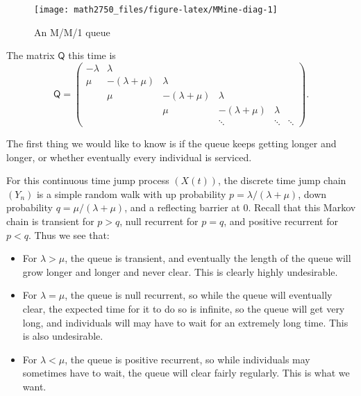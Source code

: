 \documentclass[
  a4paper,
]{article}
\providecommand{\tightlist}{%
  \setlength{\itemsep}{0pt}\setlength{\parskip}{0pt}}
\theoremstyle{definition}
\theoremstyle{definition}
\theoremstyle{definition}
\theoremstyle{remark}
\begin{document}
\begin{figure}

{\centering \texttt{[image: math2750\_files/figure-latex/MMine-diag-1]} 

}

\caption{An M/M/1 queue}\label{fig:MMine-diag}
\end{figure}

The matrix \(\mathsf Q\) this time is
\[ \mathsf Q = \begin{pmatrix}
-\lambda & \lambda          &                  &                  &         &        \\
\mu      & -(\lambda + \mu) & \lambda          &                  &         &        \\
         & \mu              & -(\lambda + \mu) & \lambda          &         &        \\
         &                  & \mu              & -(\lambda + \mu) & \lambda &        \\
         &                  &                  & \ddots           & \ddots  & \ddots
\end{pmatrix} . \]

The first thing we would like to know is if the queue keeps getting longer and longer, or whether eventually every individual is serviced.

For this continuous time jump process \((X(t))\), the discrete time jump chain \((Y_n)\) is a simple random walk with up probability \(p = \lambda/(\lambda + \mu)\), down probability \(q = \mu/(\lambda + \mu)\), and a reflecting barrier at 0. Recall that this Markov chain is transient for \(p > q\), null recurrent for \(p = q\), and positive recurrent for \(p < q\). Thus we see that:

\begin{itemize}
\tightlist
\item
  For \(\lambda > \mu\), the queue is transient, and eventually the length of the queue will grow longer and longer and never clear. This is clearly highly undesirable.
\item
  For \(\lambda = \mu\), the queue is null recurrent, so while the queue will eventually clear, the expected time for it to do so is infinite, so the queue will get very long, and individuals will may have to wait for an extremely long time. This is also undesirable.
\item
  For \(\lambda < \mu\), the queue is positive recurrent, so while individuals may sometimes have to wait, the queue will clear fairly regularly. This is what we want.
\end{itemize}
\end{document}
